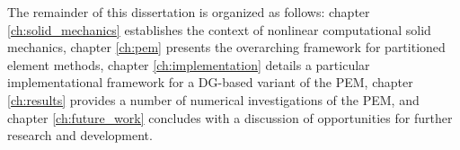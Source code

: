 	The remainder of this dissertation is organized as follows: chapter \ref{ch:solid_mechanics} establishes the context of nonlinear computational solid mechanics, chapter \ref{ch:pem} presents the overarching framework for partitioned element methods, chapter \ref{ch:implementation} details a particular implementational framework for a DG-based variant of the PEM, chapter \ref{ch:results} provides a number of numerical investigations of the PEM, and chapter \ref{ch:future_work} concludes with a discussion of opportunities for further research and development.